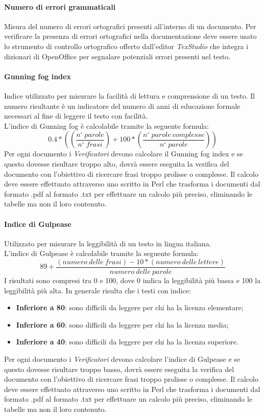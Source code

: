 \paragraph{Numero di errori grammaticali}\Spazio
Misura del numero di errori ortografici presenti all'interno di un documento.
Per verificare la presenza di errori ortografici nella documentazione deve essere usato lo strumento di controllo ortografico offerto dall'editor \emph{TexStudio} che integra i dizionari di OpenOffice per segnalare potenziali errori presenti nel testo.

\paragraph{Gunning fog index}\Spazio
Indice utilizzato per misurare la facilità di lettura e comprensione di un testo. Il numero risultante è un indicatore del numero di anni di educazione formale necessari al fine di leggere il testo con facilità. \\
L'indice di Gunning fog è calcolabile tramite la seguente formula:
$$
0.4*((\frac{n^{\circ}\:parole}{n^{\circ}\:frasi})+100*(\frac{n^{\circ}\:parole\:complesse}{n^{\circ}\:parole}))
$$
Per ogni documento i \emph{Verificatori} devono calcolare il Gunning fog index e se questo dovesse risultare troppo alto, dovrà essere eseguita la verifica del documento con l'obiettivo di ricercare frasi troppo prolisse o complesse. Il calcolo deve essere effettuato attraverso uno  scritto in Perl che trasforma i documenti dal formato .pdf al formato .txt per effettuare un calcolo più preciso, eliminando le tabelle ma non il loro contenuto.
\paragraph{Indice di Gulpease}\Spazio
Utilizzato per misurare la leggibilità di un testo in lingua italiana.\\
L'indice di Gulpease è calcolabile tramite la seguente formula:
$$
89+\frac{(numero\:delle\:frasi)-10*(numero\:delle\:lettere)}{numero\:delle\:parole}
$$
I risultati sono compresi tra 0 e 100, dove 0 indica la leggibilità più bassa e 100 la leggibilità più alta. In generale risulta che i testi con indice:
\begin{itemize}
	\item{\textbf{Inferiore	a 80}}: sono difficili da leggere per chi ha la licenza elementare;
	\item{\textbf{Inferiore	a 60}}: sono difficili da leggere per chi ha la licenza media;
	\item{\textbf{Inferiore	a 40}}: sono difficili da leggere per chi ha la licenza superiore.
\end{itemize}
Per ogni documento i \emph{Verificatori} devono calcolare l'indice di Gulpease e se questo dovesse risultare troppo basso, dovrà essere eseguita la verifica del documento con l'obiettivo di ricercare frasi troppo prolisse o complesse. Il calcolo deve essere effettuato attraverso uno  scritto in Perl che trasforma i documenti dal formato .pdf al formato .txt per effettuare un calcolo più preciso, eliminando le tabelle ma non il loro contenuto.


